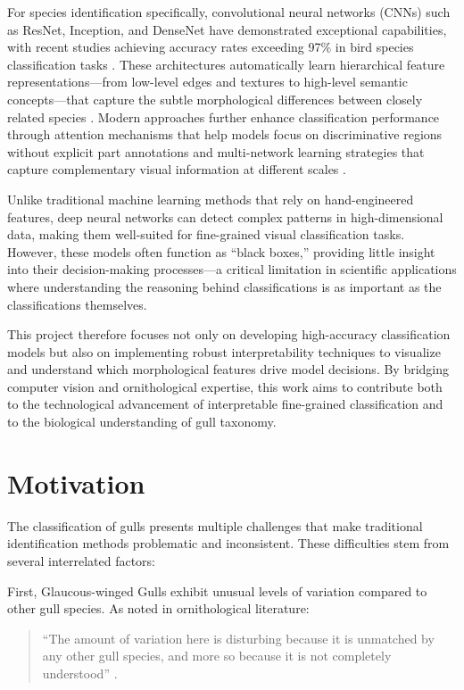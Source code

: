 For species identification specifically, convolutional neural networks (CNNs) such as ResNet, Inception, and DenseNet have demonstrated exceptional capabilities, with recent studies achieving accuracy rates exceeding 97\% in bird species classification tasks \cite{he2016}. These architectures automatically learn hierarchical feature representations—from low-level edges and textures to high-level semantic concepts—that capture the subtle morphological differences between closely related species \cite{simonyan2014}. Modern approaches further enhance classification performance through attention mechanisms that help models focus on discriminative regions without explicit part annotations and multi-network learning strategies that capture complementary visual information at different scales \cite{vaswani2017}.

Unlike traditional machine learning methods that rely on hand-engineered features, deep neural networks can detect complex patterns in high-dimensional data, making them well-suited for fine-grained visual classification tasks. However, these models often function as ``black boxes,'' providing little insight into their decision-making processes—a critical limitation in scientific applications where understanding the reasoning behind classifications is as important as the classifications themselves.

This project therefore focuses not only on developing high-accuracy classification models but also on implementing robust interpretability techniques to visualize and understand which morphological features drive model decisions. By bridging computer vision and ornithological expertise, this work aims to contribute both to the technological advancement of interpretable fine-grained classification and to the biological understanding of gull taxonomy.

\section*{Motivation}

The classification of gulls presents multiple challenges that make traditional identification methods problematic and inconsistent. These difficulties stem from several interrelated factors:

First, Glaucous-winged Gulls exhibit unusual levels of variation compared to other gull species. As noted in ornithological literature:

\begin{quote}
    ``The amount of variation here is disturbing because it is unmatched by any other gull species, and more so because it is not completely understood'' \cite{ornithology2023}.
\end{quote}

